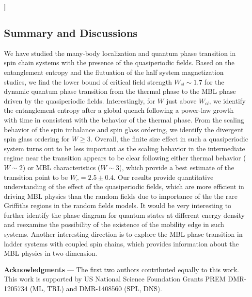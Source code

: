 \documentclass[prl,aps,epsf,showpacs,twocolumn,letterpaper]{revtex4}
\begin{document}
]

\subsection{Summary and Discussions}

We have studied the many-body localization and quantum phase transition in spin chain systems with the presence of the quasiperiodic fields.    
Based on the entanglement entropy and the flutuation of the half system magnetization studies, 
we find the lower bound of critical field strength $W_{cl}\sim 1.7$ for 
the dynamic quantum phase  transition from the thermal phase 
to the MBL phase  driven by the quasiperiodic fields. Interestingly,   for $W$ just above $W_{cl}$, we identify the
entanglement entropy after a global quench following a power-law growth with time in consistent with the behavior of the
thermal phase.   From the scaling behavior of the spin imbalance and spin glass ordering, 
we identify the divergent spin glass ordering for $W\geq 3$.    Overall, the finite size effect in such a quasiperiodic system turns
out to be less important as the scaling behavior in the intermediate regime near the transition appears to be clear following either
thermal behavior ($W \sim 2 $) or MBL characteristics ($W\sim 3$), which provide a best estimate of the transition point to be $W_c=2.5\pm 0.4$.  
Our results provide quantitative understanding of the effect of the quasiperiodic fields,  which are more efficient in driving
MBL physics than the random  fields due to importance of the the rare   Griffiths regions in the random
fields models.
It would be very interesting to further identify the phase diagram for quantum states at different energy density and reexamine
the possibility of  the existence of the mobility edge  in such systems.  Another interesting direction is to explore
the MBL phase transition in ladder systems with coupled spin chains, which provides information about the MBL physics
in two dimension.   


                                 

{\bf Acknowledgments} --- The first two authors contributed equally to this
work.  This work is supported by US National Science Foundation  Grants PREM
DMR-1205734 (ML, TRL) and DMR-1408560 (SPL, DNS).


%
%
\end{document}
